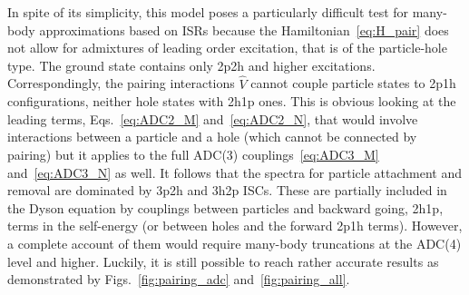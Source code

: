 In spite of its simplicity,  this model poses a particularly difficult test for many-body approximations based on ISRs because the Hamiltonian~\eqref{eq:H_pair} does not allow for admixtures of leading order excitation, that is of the particle-hole type. The ground state contains only 2p2h and higher excitations. Correspondingly, the pairing interactions $\widehat{V}$ cannot couple particle states to 2p1h configurations, neither hole states with  2h1p ones.  This is obvious looking at  the  leading terms, Eqs.~\eqref{eq:ADC2_M} and~\eqref{eq:ADC2_N}, that would involve interactions between a particle and a hole (which  cannot be connected by pairing)  but it applies to the full ADC(3) couplings~\eqref{eq:ADC3_M} and~\eqref{eq:ADC3_N} as well. It follows  that  the spectra for  particle attachment and removal are dominated  by 3p2h and 3h2p ISCs. These are partially included in the Dyson equation by couplings between particles and backward going, 2h1p, terms in the self-energy (or between holes and the forward 2p1h terms). However, a complete account of them would require many-body truncations at the ADC(4) level and higher.  Luckily, it is still possible to reach rather accurate results as demonstrated by Figs.~\ref{fig:pairing_adc} and~\ref{fig:pairing_all}.


